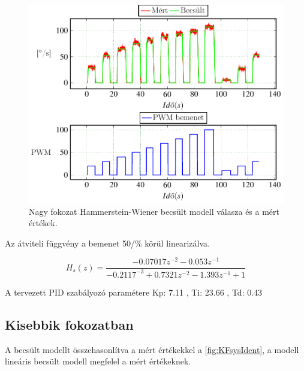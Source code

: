 \begin{figure}[H]
  \includegraphics{tikz/NFsysIdent.pdf}
  \caption{Nagy fokozat Hammerstein-Wiener becsült modell válasza és a mért értékek.}
  \label{fig:NFsysIdent}
\end{figure}


Az átviteli függvény a bemenet 50/\% körül linearizálva.

\begin{equation}
    H_s(z)=\frac{-0.07017z^{-2} -0.053z^{-1}}{-0.2117^{-3}+0.7321z^{-2} -1.393z^{-1} +1}
\end{equation}

A tervezett PID szabályozó paramétere Kp: 7.11 , Ti: 23.66 , Td: 0.43

\subsection{Kisebbik fokozatban}

A becsült modellt összehasonlítva a mért értékekkel a \ref{fig:KFsysIdent}, a modell lineáris becsült modell megfelel a mért értékeknek.


